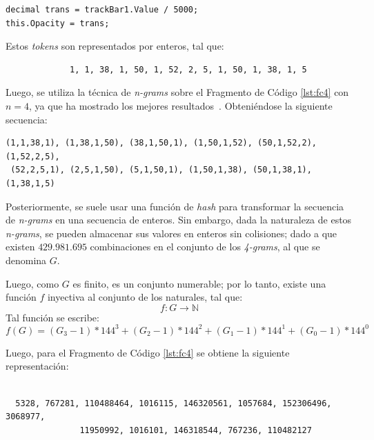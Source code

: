 \begin{lstlisting}[caption={Fragmento de código en c++},label={lst:fc4}]
decimal trans = trackBar1.Value / 5000;
this.Opacity = trans;
\end{lstlisting}
Estos \textit{tokens} son representados por enteros, tal que:

\begin{verbatim}
             1, 1, 38, 1, 50, 1, 52, 2, 5, 1, 50, 1, 38, 1, 5
\end{verbatim}

Luego, se utiliza la técnica de \textit{n-grams} sobre el Fragmento de Código
\ref{lst:fc4} con $n = 4$, ya que ha mostrado los mejores resultados~\cite{Burrows:2007:EPD:1228662.1228664}.
Obteniéndose la siguiente secuencia:

\begin{verbatim}
(1,1,38,1), (1,38,1,50), (38,1,50,1), (1,50,1,52), (50,1,52,2), (1,52,2,5),
 (52,2,5,1), (2,5,1,50), (5,1,50,1), (1,50,1,38), (50,1,38,1), (1,38,1,5)
\end{verbatim}

Posteriormente, se suele usar una función de \textit{hash}
para transformar la secuencia de \textit{n-grams} en una secuencia de enteros.
Sin embargo, dada la naturaleza de estos \textit{n-grams}, 
se pueden almacenar sus valores en enteros sin colisiones;
dado a que existen $429.981.695$ combinaciones
en el conjunto de los \textit{4-grams}, al que se denomina $G$.

Luego, como $G$ es finito, es un conjunto numerable; 
por lo tanto, existe una función $f$ inyectiva al conjunto de los naturales, tal que:
\begin{equation*}
f : G \rightarrow\mathbb{N}
\end{equation*}
Tal función se escribe:
\begin{equation*}
f(G) = (G_3-1) * 144^3 + (G_2-1) * 144^2 + (G_1-1) * 144^1 + (G_0-1)*144^0
\end{equation*}



Luego, para el Fragmento de Código \ref{lst:fc4} se obtiene la siguiente representación:

\begin{verbatim}

  5328, 767281, 110488464, 1016115, 146320561, 1057684, 152306496, 3068977,
               11950992, 1016101, 146318544, 767236, 110482127
\end{verbatim}

